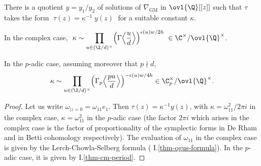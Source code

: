 \begin{thm}\label{thm:7.6.4}
 There is a quotient $y=y_1/y_2$ of solutions of $\nabla_{\mathrm{GM}}$ in
 $\ovl{\Q}[[z]]$ such that $\tau$ takes the form
 $\;\tau(z)=\kappa^{-1}\;y(z)\;$ for a suitable constant $\kappa$.

\noindent In the complex case, $\;\kappa\sim\displaystyle
 \prod_{u\in (\Z/d)^\times}
 \Bigl(\Gamma\Bigl\langle\frac{u}{d}\Bigr\rangle\Bigr)^{\epsilon(u)w/2h}\;\in
 \C^\times/\ovl{\Q}^\times$.

\noindent In the $p$-adic case, assuming moreover that $p\nmid d $, 
\begin{equation*}
 \kappa\sim \prod_{u\in (\Z/d)^\times}
  \Bigl(\Gamma_p\Bigl\langle\frac{pu}{d}\Bigr\rangle\Bigr)^{-\epsilon(u)w/4h}
  \in \C_p^\times/\ovl{\Q}^{\times}.
\end{equation*}
\end{thm}
\begin{proof}
 Let us write $\omega_{| z=0}=\omega_{11}e_1$. Then
 $\tau(z)=\kappa^{-1} y(z)$, with $\kappa = \omega_{11}^2/2\pi i$ in
 the complex case, $\kappa = \omega_{11}^2$ in the $p$-adic case (the
 factor $2\pi i$ which arises in the complex case is the factor of
 proportionality of the symplectic forms in De Rham and in Betti
 cohomology respectively). The evaluation of $\omega_{11}$ in the
 complex case is given by the Lerch-Chowla-Selberg formula (\cf
 I.\ref{thm-ogus-formula}). In the $p$-adic case, it is given by
 I.\ref{thm-cm-period}.
\end{proof}

